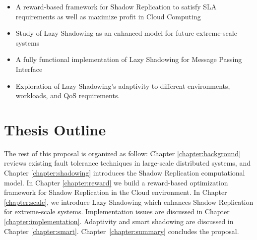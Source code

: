 \begin{itemize}
\item A reward-based framework for Shadow Replication to satisfy SLA requirements as well as maximize profit in Cloud Computing
\item Study of Lazy Shadowing as an enhanced model for future extreme-scale systems
\item A fully functional implementation of Lazy Shadowing for Message Passing Interface
\item Exploration of Lazy Shadowing's adaptivity to different environments, workloads, and QoS requirements. 
\end{itemize}


\section{Thesis Outline}
\label{outline}
The rest of this proposal is organized as follow:  
Chapter \ref{chapter:background} reviews existing fault tolerance techniques in large-scale distributed systems, 
and Chapter \ref{chapter:shadowing} introduces the Shadow Replication computational model. In Chapter \ref{chapter:reward} we build a reward-based optimization framework for Shadow Replication in the Cloud environment.
In Chapter \ref{chapter:scale}, we introduce Lazy Shadowing which enhances Shadow Replication for extreme-scale systems. 
Implementation issues are discussed in Chapter \ref{chapter:implementation}. Adaptivity and smart shadowing are discussed in Chapter \ref{chapter:smart}.
Chapter~\ref{chapter:summary}  concludes the proposal.








